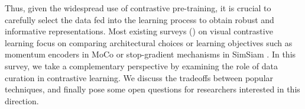 Thus, given the widespread use of contrastive pre-training, it is crucial to carefully select the data fed into the learning process to obtain robust and informative representations. 
Most existing surveys (\cite{gui2024survey,jaiswal2020survey,giakoumoglou2024review}) on visual contrastive learning focus on comparing architectural choices or learning objectives such as momentum encoders in MoCo \cite{he2020momentum} or stop-gradient mechanisms in SimSiam \cite{chen2021exploring}. In this survey, we take a complementary perspective by examining the role of data curation in contrastive learning. We discuss the tradeoffs between popular techniques, and finally pose some open questions for researchers interested in this direction.






